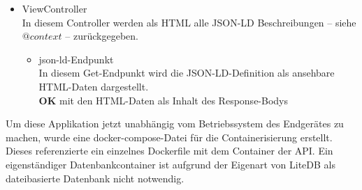 \begin{itemize}

        \item ViewController \\
            In diesem Controller werden als HTML alle \ac{JSON-LD} Beschreibungen -- siehe $@context$ -- zurückgegeben.
            \begin{itemize}
                \item json-ld-Endpunkt \\
                    In diesem Get-Endpunkt wird die JSON-LD-Definition als ansehbare HTML-Daten dargestellt.
                    \\
                    \textbf{OK} mit den HTML-Daten als Inhalt des Response-Bodys 
            \end{itemize}
    \end{itemize}


    Um diese Applikation jetzt unabhängig vom Betriebssystem des Endgerätes zu machen, wurde eine docker-compose-Datei für die Containerisierung erstellt.
    Dieses referenzierte ein einzelnes Dockerfile mit dem Container der API.
    Ein eigenständiger Datenbankcontainer ist aufgrund der Eigenart von LiteDB als dateibasierte Datenbank nicht notwendig.
